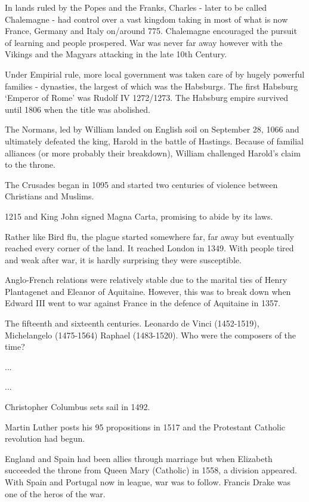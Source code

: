 \begin{description}
\item [Charlemagne] In lands ruled by the Popes and the Franks, Charles - later to be called Chalemagne - had control over a vast kingdom taking in most of what is now France, Germany and Italy on/around 775. Chalemagne encouraged the pursuit of learning and people prospered. War was never far away however with the Vikings and the Magyars attacking in the late 10th Century. 
\item [Habsburg] Under Empirial rule, more local government was taken care of by hugely powerful families - dynasties, the largest of which was the Habsburgs. The first Habsburg `Emperor of Rome' was Rudolf IV 1272/1273. The Habsburg empire survived until 1806 when the title was abolished. 
\item [1066] The Normans, led by William landed on English soil on September 28, 1066 and ultimately defeated the king, Harold in the battle of Hastings. Because of familial alliances (or more probably their breakdown), William challenged Harold's claim to the throne. 
\item [The power of the church] The Crusades began in 1095 and started two centuries of violence between Christians and Muslims. 
\item [Law and Order] 1215 and King John signed Magna Carta, promising to abide by its laws. 
\item [The Black Death] Rather like Bird flu, the plague started somewhere far, far away but eventually reached every corner of the land. It reached London in 1349. With people tired and weak after war, it is hardly surprising they were susceptible. 
\item [The Hundred Years' War] Anglo-French relations were relatively stable due to the marital ties of Henry Plantagenet and Eleanor of Aquitaine. However, this was to break down when Edward III went to war against France in the defence of Aquitaine in 1357. 
\item [The Renaissance] The fifteenth and sixteenth centuries. Leonardo de Vinci (1452-1519), Michelangelo (1475-1564) Raphael (1483-1520). Who were the composers of the time? 
\item ...
\item ...
\item [Brave new world] Christopher Columbus sets sail in 1492. 
\item [Reformation] Martin Luther posts his 95 propositions in 1517 and the Protestant Catholic revolution had begun. 
\item [Elizabeth I] England and Spain had been allies through marriage but when Elizabeth succeeded the throne from Queen Mary (Catholic) in 1558, a division appeared. With Spain and Portugal now in league, war was to follow. Francis Drake was one of the heros of the war. 

\end{description}
